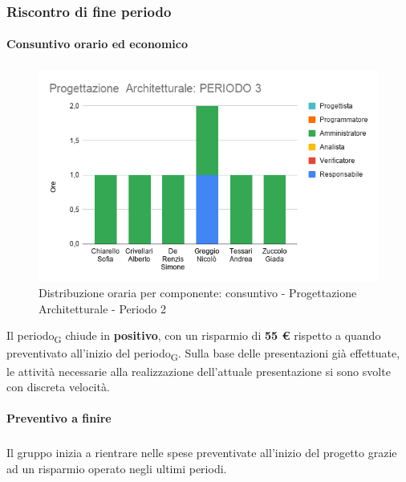 \subsubsection{Riscontro di fine periodo}


\paragraph{Consuntivo orario ed economico}
\subparagraph*{}

\contabilitaTable{
	
}

\begin{figure}[H]
	\centering
	\includegraphics[scale=0.7]{res/images/charts/consuntivo/prog_arch_3.png}
	\caption{Distribuzione oraria per componente: consuntivo - Progettazione Architetturale - Periodo 2}
\end{figure}


Il periodo\textsubscript{G} chiude in \textbf{positivo}, con un risparmio di \textbf{55 \euro} rispetto a quando preventivato all'inizio del periodo\textsubscript{G}. Sulla base delle presentazioni già effettuate, le attività necessarie alla realizzazione dell'attuale presentazione si sono svolte con discreta velocità.


\paragraph{Preventivo a finire}
\subparagraph*{}

\pafTable{
	
}

Il gruppo inizia a rientrare nelle spese preventivate all'inizio del progetto grazie ad un risparmio operato negli ultimi periodi.